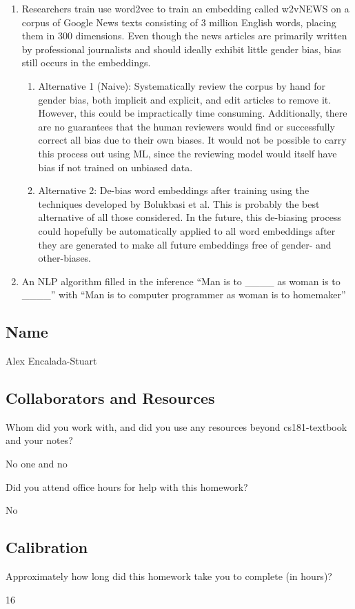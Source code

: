 \documentclass[submit]{harvardml}
\begin{document}
\begin{enumerate}
	\item Researchers train use word2vec to train an embedding called w2vNEWS on a corpus of Google News texts consisting of 3 million English words, placing them in 300 dimensions. Even though the news articles are primarily written by professional journalists and should ideally exhibit little gender bias, bias still occurs in the embeddings.
		\begin{enumerate}
			\item Alternative 1 (Naive): Systematically review the corpus by hand for gender bias, both implicit and explicit, and edit articles to remove it. However, this could be impractically time consuming. Additionally, there are no guarantees that the human reviewers would find or successfully correct all bias due to their own biases. It would not be possible to carry this process out using ML, since the reviewing model would itself have bias if not trained on unbiased data.
			\item Alternative 2: De-bias word embeddings after training using the techniques developed by Bolukbasi et al. This is probably the best alternative of all those considered. In the future, this de-biasing process could hopefully be automatically applied to all word embeddings after they are generated to make all future embeddings free of gender- and other-biases. 
		\end{enumerate}

	\item An NLP algorithm filled in the inference “Man is to \_\_\_\_ as woman is to \_\_\_\_” with “Man is to computer programmer as woman is to homemaker”
\end{enumerate}

\newpage
\subsection*{Name}

Alex Encalada-Stuart

\subsection*{Collaborators and Resources}
Whom did you work with, and did you use any resources beyond cs181-textbook and your notes?

No one and no

Did you attend office hours for help with this homework?

No

\subsection*{Calibration}
Approximately how long did this homework take you to complete (in hours)? 

16
\end{document}
